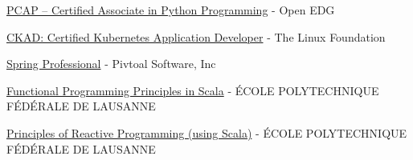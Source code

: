 \begin{cvitems}
\sectionspace
\sectionspace
\vspace{1mm}
	\fontsize{11pt}{1.4em}\bodyfontlight\upshape\color{text}
        \item {\href{https://verify.openedg.org/?id=Kj33.9QB1.1saR}{PCAP – Certified Associate in Python Programming}} - {Open EDG}
        \item {\href{https://www.credly.com/badges/63392815-d840-4d5e-943d-13a257e0b875}{CKAD: Certified Kubernetes Application Developer}} - {The Linux Foundation}
        \item {\href{https://bcert.me/spurmtics}{Spring Professional}} - {Pivtoal Software, Inc}
        \item {\href{https://www.coursera.org/account/accomplishments/certificate/QYMUQ6M5KS}{Functional Programming Principles in Scala}} - {ÉCOLE POLYTECHNIQUE FÉDÉRALE DE LAUSANNE}
        \item {\href{https://www.coursera.org/account/accomplishments/verify/263CALSP9A}{Principles of Reactive Programming (using Scala)}} - {ÉCOLE POLYTECHNIQUE FÉDÉRALE DE LAUSANNE}
    \end{cvitems}
\vspace{1mm}
\sectionspace